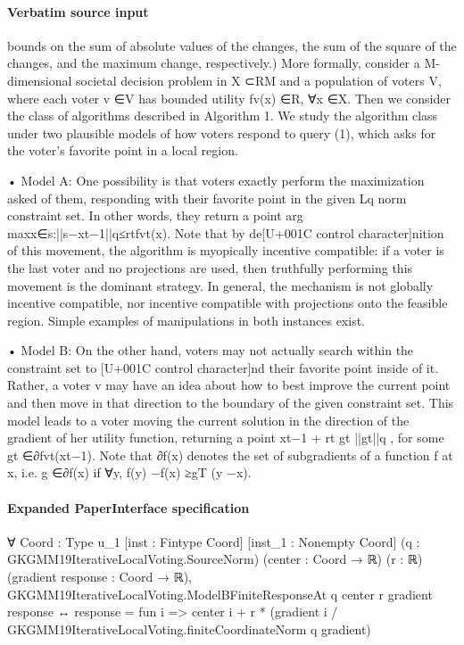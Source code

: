 \documentclass[10pt]{article}
\begin{document}
\paragraph{Verbatim source input}
\begin{ReviewVerbatim}
bounds on the sum of absolute values of the changes, the sum of the square of the changes,
and the maximum change, respectively.)
More formally, consider a M-dimensional societal decision problem in X ⊂RM and a
population of voters V, where each voter v ∈V has bounded utility fv(x) ∈R, ∀x ∈X.
Then we consider the class of algorithms described in Algorithm 1. We study the algorithm
class under two plausible models of how voters respond to query (1), which asks for the
voter's favorite point in a local region.

• Model A:
One possibility is that voters exactly perform the maximization asked of
them, responding with their favorite point in the given Lq norm constraint set. In other
words, they return a point arg maxx∈{s:||s−xt−1||q≤rt}fvt(x). Note that by de[U+001C control character]nition of this
movement, the algorithm is myopically incentive compatible: if a voter is the last voter
and no projections are used, then truthfully performing this movement is the dominant
strategy. In general, the mechanism is not globally incentive compatible, nor incentive
compatible with projections onto the feasible region. Simple examples of manipulations
in both instances exist.

• Model B: On the other hand, voters may not actually search within the constraint set
to [U+001C control character]nd their favorite point inside of it. Rather, a voter v may have an idea about how
to best improve the current point and then move in that direction to the boundary of
the given constraint set. This model leads to a voter moving the current solution in the
direction of the gradient of her utility function, returning a point xt−1 + rt
gt
||gt||q , for some
gt ∈∂fvt(xt−1). Note that ∂f(x) denotes the set of subgradients of a function f at x, i.e.
g ∈∂f(x) if ∀y, f(y) −f(x) ≥gT (y −x).
\end{ReviewVerbatim}


\paragraph{Expanded PaperInterface specification}
\begin{ReviewVerbatim}
∀ {Coord : Type u_1} [inst : Fintype Coord] [inst_1 : Nonempty Coord] (q : GKGMM19IterativeLocalVoting.SourceNorm)
  (center : Coord → ℝ) (r : ℝ) (gradient response : Coord → ℝ),
  GKGMM19IterativeLocalVoting.ModelBFiniteResponseAt q center r gradient response ↔
    response = fun i => center i + r * (gradient i / GKGMM19IterativeLocalVoting.finiteCoordinateNorm q gradient)
\end{ReviewVerbatim}
\end{document}

